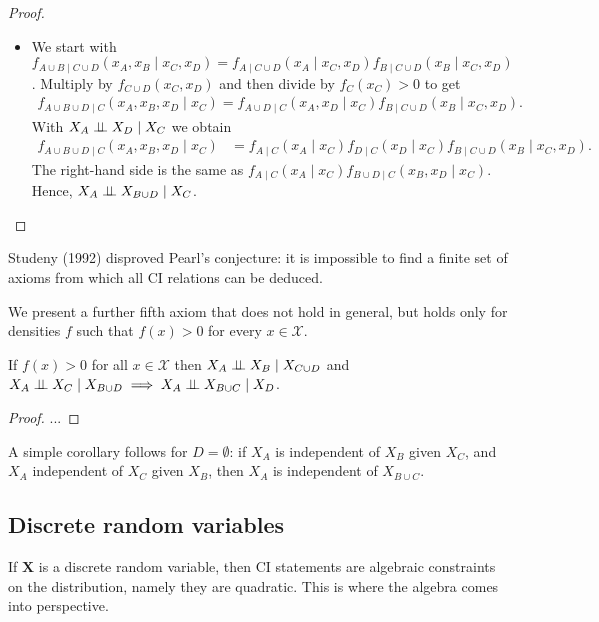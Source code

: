 \begin{proof}
\begin{itemize}
  \item We start with \( f_{A \cup B \mid C \cup D}(x_A,x_B \mid x_C, x_D) = f_{A \mid C \cup D}(x_A \mid x_{C}, x_D)  f_{B \mid C \cup D}(x_B \mid x_{C}, x_D)\). Multiply by \( f_{C \cup D}(x_C, x_D) \) and then divide by \( f_C(x_C) > 0 \) to get 
  \begin{align*}
    f_{A \cup B \cup D \mid C} (x_A,x_B,x_D \mid x_C) = f_{A \cup D \mid C}(x_A, x_D \mid x_C)f_{B \mid C \cup D}(x_B \mid x_C, x_D).
  \end{align*}
  With \( X_A \perp \!\!\! \perp X_D \mid X_C \) we obtain 
  \begin{align*}
    f_{A \cup B \cup D \mid C} (x_A,x_B,x_D \mid x_C) &= f_{A \mid C}(x_A \mid x_C)f_{D \mid C}(x_D \mid x_C)f_{B \mid C \cup D}(x_B \mid x_C, x_D).
  \end{align*}
  The right-hand side is the same as \( f_{A \mid C}(x_A \mid x_C)f_{B \cup D \mid C}(x_B, x_D \mid x_C)  \).
  Hence, \( X_A \perp \!\!\! \perp X_{B \cup D} \mid X_C \).
\end{itemize}
 \end{proof}

Studeny (1992) disproved Pearl's conjecture: it is impossible to find a finite set of axioms from which all CI relations can be deduced.

We present a further fifth axiom that does not hold in general, but holds only for densities \( f \) such that \( f(x) > 0 \) for every \( x \in \mathcal{X} \).
\begin{prop}
If \( f(x) > 0 \) for all \( x \in \mathcal{X} \) then \( X_A \perp \!\!\! \perp X_B \mid X_{C \cup D} \) and \( X_A \perp \!\!\! \perp X_C \mid X_{B \cup D} \implies X_A \perp \!\!\! \perp X_{B \cup C} \mid X_D\).
\end{prop}

\begin{proof}
  ...
\end{proof}

A simple corollary follows for \( D = \emptyset \): if \( X_A \) is independent of \( X_B \) given \( X_C \), and \( X_A \) independent of \( X_C \) given \( X_B \), then \( X_A \) is independent of \( X_{B \cup C} \).

\subsection{Discrete random variables}

If \( \mathbf X \) is a discrete random variable, then CI statements are algebraic constraints on the distribution, namely they are quadratic. This is where the algebra comes into perspective.

